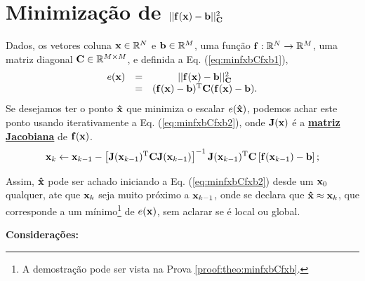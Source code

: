 \section{Minimização de $||\VECTOR{f}(\VECTOR{x})-\VECTOR{b}||_{\MATRIX{C}}^2$}




\begin{theorem}\label{theo:minfxbCfxb}
Dados,
os vetores coluna $\VECTOR{x}\in \mathbb{R}^N$ e $\VECTOR{b}\in \mathbb{R}^M$,  
uma função $\VECTOR{f}:\mathbb{R}^{N} \rightarrow \mathbb{R}^{M}$, 
uma matriz diagonal $\MATRIX{C} \in \mathbb{R}^{M\times M}$, e 
definida a Eq. (\ref{eq:minfxbCfxb1}),
\begin{equation}\label{eq:minfxbCfxb1}
\begin{matrix}
e(\VECTOR{x}) & = & ||\VECTOR{f}(\VECTOR{x})-\VECTOR{b}||_{\MATRIX{C}}^2 \\
              & = & (\VECTOR{f}(\VECTOR{x})-\VECTOR{b})^{\transpose}\MATRIX{C}(\VECTOR{f}(\VECTOR{x})-\VECTOR{b}).
\end{matrix}
\end{equation}
Se desejamos ter o ponto $\VECTOR{\hat{x}}$ que minimiza o escalar $e(\VECTOR{\hat{x}})$,
podemos achar este ponto usando iterativamente a Eq. (\ref{eq:minfxbCfxb2}),
onde  $\MATRIX{J}(\VECTOR{x})$ é a \hyperref[def:jacobian]{\textbf{matriz Jacobiana}}  de $\VECTOR{f}(\VECTOR{x})$.
\begin{equation}\label{eq:minfxbCfxb2}
\VECTOR{x}_{k} \leftarrow \VECTOR{x}_{k-1}-
\left[ \MATRIX{J}(\VECTOR{x}_{k-1})^{\transpose}\MATRIX{C} \MATRIX{J}(\VECTOR{x}_{k-1}) \right]^{-1}
 \MATRIX{J}(\VECTOR{x}_{k-1})^{\transpose}\MATRIX{C}\left[\VECTOR{f}(\VECTOR{x}_{k-1})-\VECTOR{b}\right];
\end{equation}



Assim, $\VECTOR{\hat{x}}$ pode ser achado 
iniciando a Eq. (\ref{eq:minfxbCfxb2}) desde um $\VECTOR{x}_{0}$ qualquer, 
ate que $\VECTOR{x}_{k}$ seja muito próximo a $\VECTOR{x}_{k-1}$,
onde se declara que $\VECTOR{\hat{x}} \approx \VECTOR{x}_{k}$,
que corresponde a um mínimo\footnote{\label{ref:minfx}A
demostração pode ser vista na Prova \ref{proof:theo:minfxbCfxb}.} de $e(\VECTOR{x})$,
sem aclarar se é local ou global.

\textbf{Considerações:}


\end{theorem}

